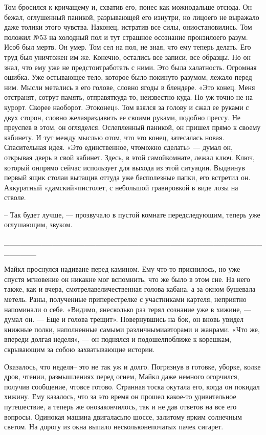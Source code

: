 Том бросился к кричащему и, схватив его, понес как можнодальше отсюда. Он бежал, оглушенный паникой, разрывающей его изнутри, но лицоего не выражало даже толики этого чувства. Наконец, истратив все силы, ониостановились. Том положил №53 на холодный пол и тут страшное осознание пронзилоего разум. Исоб был мертв. Он умер. Том сел на пол, не зная, что ему теперь делать. Его труд был уничтожен им же. Конечно, остались все записи, все образцы. Но он знал, что ему уже не предстоитработать с ними. Это была халатность. Огромная ошибка. Уже остывающее тело, которое было покинуто разумом, лежало перед ним. Мысли метались в его голове, словно ягоды в блендере. «Это конец. Меня отстранят, сотрут память, отправяткуда-то, неизвестно куда. Но уж точно не на курорт. Скорее наоборот. Этоконец». Том взялся за голову и сжал ее руками с двух сторон, словно желаяраздавить ее своими руками, подобно прессу. Не преуспев в этом, он огляделся. Ослепленный паникой, он пришел прямо к своему кабинету. И тут между мыслью отом, что это конец, затесалась новая. Спасительная идея. «Это единственное, чтоможно сделать» — думал он, открывая дверь в свой кабинет. Здесь, в этой самойкомнате, лежал ключ. Ключ, который онпрямо сейчас использует для выхода из этой ситуации. Выдвинув первый ящик столаи вытащив оттуда уже бесполезные папки, его встретил он. Аккуратный «дамский»пистолет, с небольшой гравировкой в виде лозы на стволе.

– Так будет лучше, — прозвучало в пустой комнате передследующим, теперь уже оглушающим, звуком.

______________________________________________________

Майкл проснулся надиване перед камином. Ему что-то приснилось, но уже спустя мгновение он никакне мог вспомнить, что же было в этом сне. На него также, как и вчера, смотрелавеличественная голова кабана, а за окном бушевала метель. Раны, полученные приперестрелке с участниками картеля, неприятно напоминали о себе. «Видимо, янесколько раз терял сознание уже в хижине, — думал он. — Еще и голова трещит». Повернувшись на бок, он вновь увидел книжные полки, наполненные самыми различнымиавторами и жанрами. «Что же, впереди долгая неделя», — он поднялся и подошелпоближе к корешкам, скрывающим за собою захватывающие истории.

Оказалось, что неделя– это не так уж и долго. Погрязнув в готовке, уборке, колке дров, чтении, размышлениях перед огнем, Майкл даже немного огорчился, получив сообщение, чтовсе готово. Странная тоска окутала его, когда он покидал хижину. Ему казалось, что за это время он прошел какое-то удивительное путешествие, а теперь же онозакончилось, так и не дав ответов на все его вопросы. Одинокая машина двигаласьпо шоссе, залитому ярким солнечным светом. На дорогу из окна выпало нескольконепочатых пачек сигарет.

